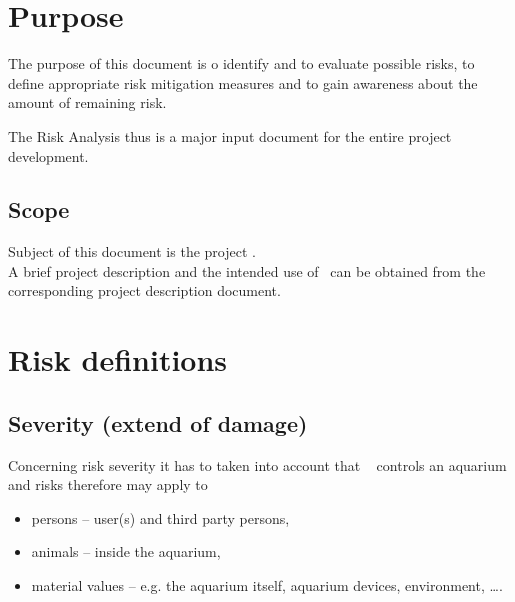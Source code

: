 \documentclass{../../git_submodules/common_docu/doc_class}
\author{\defaultAuthor}
\date{2019-04-04}
\begin{document}
  
  \section{Purpose}
  The purpose of this document is o identify and to evaluate possible risks, to define appropriate risk mitigation measures and to gain awareness about the amount of remaining risk.
  
  The Risk Analysis thus is a major input document for the entire project development.
  
  \subsection{Scope}
  Subject of this document is the project \textit{\ThisProjectName}. \\
  A brief project description and the intended use of \ThisProjectName~can be obtained from the corresponding project description document.
  \newpage
  
  \section{Risk definitions}

  \subsection{Severity (extend of damage)}
  Concerning risk severity it has to taken into account that \ThisProjectName~ controls an aquarium and risks therefore may apply to 
  \begin{itemize}
    \item persons -- user(s) and third party persons,
    \item animals -- inside the aquarium,
    \item material values -- e.g. the aquarium itself, aquarium devices, environment, \dots.
  \end{itemize}
  
\end{document}
